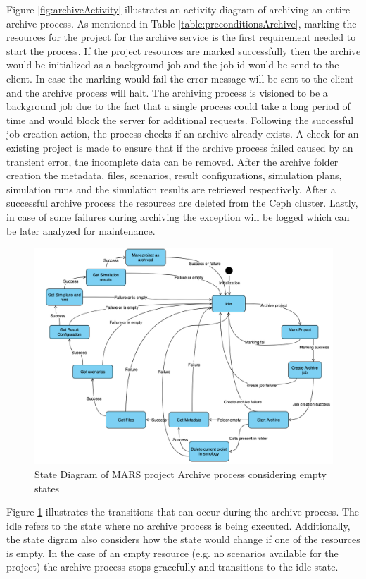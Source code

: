 Figure \ref{fig:archiveActivity} illustrates an activity diagram of archiving an entire archive process. As mentioned in Table \ref{table:preconditionsArchive},
marking the resources for the project for the archive service is the first requirement needed to start the process. If the project resources are marked successfully
then the archive would be initialized as a background job and the job id would be send to the client. In case the marking would fail the error message will be 
sent to the client and the archive process will halt. The archiving process is visioned to be a background job due to the fact that a single process could take
a long period of time and would block the server for additional requests. Following the successful job creation action, the process checks if an archive already
exists. A check for an existing project is made to ensure that if the archive process failed caused by an transient error, the incomplete data can be removed. After
the archive folder creation the metadata, files, scenarios, result configurations, simulation plans, simulation runs and the simulation results are retrieved respectively.
After a successful archive process the  resources are deleted from the Ceph cluster. Lastly, in case of some failures during archiving the exception will be logged 
which can be later analyzed for maintenance.

\begin{figure}[H]
    \centering \includegraphics[scale=0.45]{grafiken/stateArchive.png}
    \caption{State Diagram of MARS project Archive process considering empty states}
    \label{fig:stateArchive}
\end{figure}

Figure \ref{fig:stateArchive} illustrates the transitions that can occur during the archive process. The idle refers to the state where no archive process
is being executed. Additionally, the state digram also considers
how the state would change if one of the resources is empty. In the case of an empty resource (e.g. no scenarios available for the project) the archive
process stops gracefully and transitions to the idle state. 

 